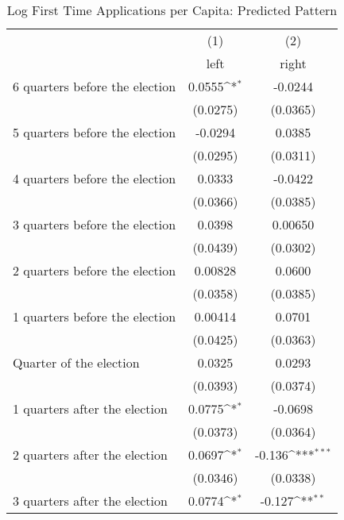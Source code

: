 \begin{table}[htbp]\centering
\def\sym#1{\ifmmode^{#1}\else\(^{#1}\)\fi}
\caption{Log First Time Applications per Capita: Predicted Pattern}
\begin{tabular}{l*{2}{c}}
\hline\hline
                    &\multicolumn{1}{c}{(1)}&\multicolumn{1}{c}{(2)}\\
                    &\multicolumn{1}{c}{left}&\multicolumn{1}{c}{right}\\
\hline
 6 quarters before the election&      0.0555\sym{*}  &     -0.0244         \\
                    &    (0.0275)         &    (0.0365)         \\
[1em]
 5 quarters before the election&     -0.0294         &      0.0385         \\
                    &    (0.0295)         &    (0.0311)         \\
[1em]
 4 quarters before the election&      0.0333         &     -0.0422         \\
                    &    (0.0366)         &    (0.0385)         \\
[1em]
 3 quarters before the election&      0.0398         &     0.00650         \\
                    &    (0.0439)         &    (0.0302)         \\
[1em]
 2 quarters before the election&     0.00828         &      0.0600         \\
                    &    (0.0358)         &    (0.0385)         \\
[1em]
 1 quarters before the election&     0.00414         &      0.0701         \\
                    &    (0.0425)         &    (0.0363)         \\
[1em]
Quarter of the election&      0.0325         &      0.0293         \\
                    &    (0.0393)         &    (0.0374)         \\
[1em]
 1 quarters after the election&      0.0775\sym{*}  &     -0.0698         \\
                    &    (0.0373)         &    (0.0364)         \\
[1em]
 2 quarters after the election&      0.0697\sym{*}  &      -0.136\sym{***}\\
                    &    (0.0346)         &    (0.0338)         \\
[1em]
 3 quarters after the election&      0.0774\sym{*}  &      -0.127\sym{**} \\

\end{tabular}
\end{table}
